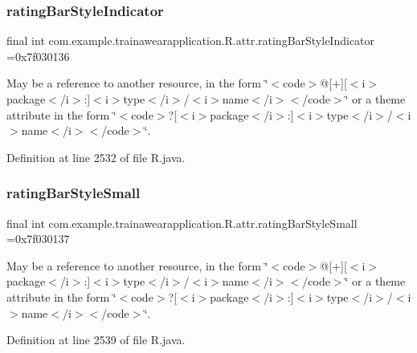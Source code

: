 \subsubsection{\texorpdfstring{ratingBarStyleIndicator}{ratingBarStyleIndicator}}
{\footnotesize\ttfamily final int com.\+example.\+trainawearapplication.\+R.\+attr.\+rating\+Bar\+Style\+Indicator =0x7f030136\hspace{0.3cm}{\ttfamily [static]}}

May be a reference to another resource, in the form \char`\"{}$<$code$>$@\mbox{[}+\mbox{]}\mbox{[}$<$i$>$package$<$/i$>$\+:\mbox{]}$<$i$>$type$<$/i$>$/$<$i$>$name$<$/i$>$$<$/code$>$\char`\"{} or a theme attribute in the form \char`\"{}$<$code$>$?\mbox{[}$<$i$>$package$<$/i$>$\+:\mbox{]}$<$i$>$type$<$/i$>$/$<$i$>$name$<$/i$>$$<$/code$>$\char`\"{}. 

Definition at line 2532 of file R.\+java.

\mbox{\label{classcom_1_1example_1_1trainawearapplication_1_1_r_1_1attr_a598a00e5f9f4ec2444c24e5072fe8bd4}} 
\subsubsection{\texorpdfstring{ratingBarStyleSmall}{ratingBarStyleSmall}}
{\footnotesize\ttfamily final int com.\+example.\+trainawearapplication.\+R.\+attr.\+rating\+Bar\+Style\+Small =0x7f030137\hspace{0.3cm}{\ttfamily [static]}}

May be a reference to another resource, in the form \char`\"{}$<$code$>$@\mbox{[}+\mbox{]}\mbox{[}$<$i$>$package$<$/i$>$\+:\mbox{]}$<$i$>$type$<$/i$>$/$<$i$>$name$<$/i$>$$<$/code$>$\char`\"{} or a theme attribute in the form \char`\"{}$<$code$>$?\mbox{[}$<$i$>$package$<$/i$>$\+:\mbox{]}$<$i$>$type$<$/i$>$/$<$i$>$name$<$/i$>$$<$/code$>$\char`\"{}. 

Definition at line 2539 of file R.\+java.

\mbox{\label{classcom_1_1example_1_1trainawearapplication_1_1_r_1_1attr_a258d6ac63a1763c177a66d833dc264ba}} 
